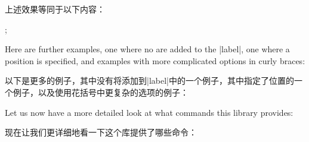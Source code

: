 上述效果等同于以下内容：
\begin{codeexample}[]
\tikz {};
\end{codeexample}

Here are further examples, one where no  are added to the
|label|, one where a position is specified, and examples with more complicated
options in curly braces:

以下是更多的例子，其中没有将添加到|label|中的一个例子，其中指定了位置的一个例子，以及使用花括号中更复杂的选项的例子：
\begin{codeexample}[preamble={\usetikzlibrary{quotes}}]
\end{codeexample}

Let us now have a more detailed look at what commands this library
provides:

现在让我们更详细地看一下这个库提供了哪些命令：

